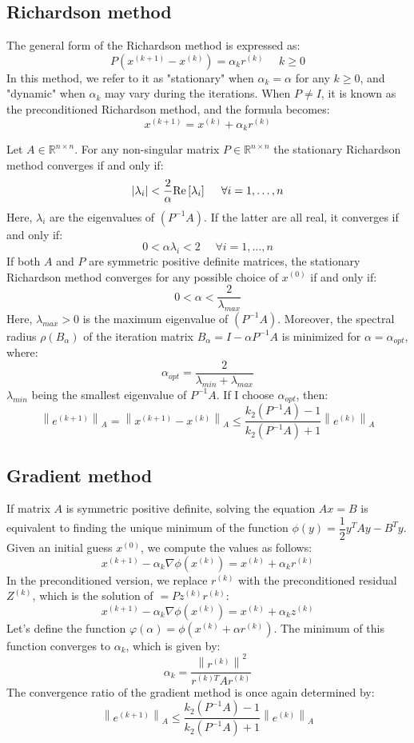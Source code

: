\subsection*{Richardson method}
The general form of the Richardson method is expressed as:
\[P(x^{(k+1)}-x^{(k)})=\alpha_kr^{(k)} \:\:\:\:\:\: k \geq 0\]
In this method, we refer to it as "stationary" when $\alpha_k=\alpha$ for any $k \geq 0$, and "dynamic" when $\alpha_k$ may vary during the iterations. 
When $P \neq I$, it is known as the preconditioned Richardson method, and the formula becomes:
\[x^{(k+1)}=x^{(k)}+\alpha_k r^{(k)}\]
\begin{proposition}
    Let $A \in \mathbb{R}^{n \times n}$. For any non-singular matrix $P \in \mathbb{R}^{n \times n}$ the stationary Richardson method converges if and only if: 
    \[\left\lvert \lambda_i\right\rvert < \dfrac{2}{\alpha} \textnormal{Re}\left[\lambda_i\right] \:\:\:\:\:\:\forall i=1,\dots,n\]
    Here, $\lambda_i$ are the eigenvalues of $(P^{-1}A)$. If the latter are all real, it converges if and only if: 
    \[0 < \alpha\lambda_i<2 \:\:\:\:\:\:\forall i=1,\dots,n\]
    If both $A$ and $P$ are symmetric positive definite matrices, the stationary Richardson method converges for any possible choice of 
    $x^{(0)}$ if and only if: 
    \[0 < \alpha < \dfrac{2}{\lambda_{max}}\]
    Here, $\lambda_{max} >0$ is the maximum eigenvalue of $(P^{-1} A)$. 
    Moreover, the spectral radius $\rho (B_{\alpha})$ of the iteration matrix $B_{\alpha}=I-\alpha P^{-1}A$ is minimized for $\alpha=\alpha_{opt}$, where: 
    \[\alpha_{opt}=\dfrac{2}{\lambda_{min}+\lambda_{max}}\]
    $\lambda_{min}$ being the smallest eigenvalue of $P^{-1}A$. 
    If I choose $\alpha_{opt}$, then: 
    \[\left\lVert e^{(k+1)}\right\rVert_A= \left\lVert x^{(k+1)}-x^{(k)}\right\rVert_A \leq \dfrac{k_2(P^{-1}A)-1}{k_2(P^{-1}A)+1}\left\lVert e^{(k)}\right\rVert_A\]
\end{proposition}

\subsection*{Gradient method}
If matrix $A$ is symmetric positive definite, solving the equation $Ax=B$ is equivalent to finding the unique minimum of the function $\phi(y)=\dfrac{1}{2}y^TAy-B^Ty$. 
Given an initial guess $x^{(0)}$, we compute the values as follows:
\[x^{(k+1)}-\alpha_{k}\nabla\phi(x^{(k)})=x^{(k)}+\alpha_kr^{(k)}\]
In the preconditioned version, we replace $r^{(k)}$ with the preconditioned residual $Z^{(k)}$, which is the solution of $=Pz^{(k)}r^{(k)}$: 
\[x^{(k+1)}-\alpha_{k}\nabla\phi(x^{(k)})=x^{(k)}+\alpha_kz^{(k)}\]
Let's define the function $\varphi(\alpha)=\phi(x^{(k)}+\alpha r^{(k)})$. 
The minimum of this function converges to $\alpha_k$, which is given by:
\[\alpha_k=\dfrac{\left\lVert r^{(k)} \right\rVert^2}{r^{(k)T}Ar^{(k)}}\]
The convergence ratio of the gradient method is once again determined by:
\[\left\lVert e^{(k+1)}\right\rVert_A\leq \dfrac{k_2(P^{-1}A)-1}{k_2(P^{-1}A)+1}\left\lVert e^{(k)}\right\rVert_A\]

